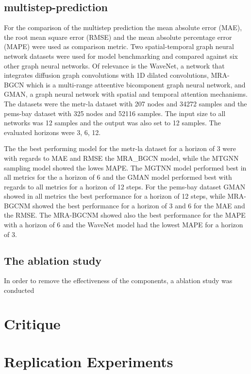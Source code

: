 \documentclass[letterpaper,twocolumn,11pt]{article}
\begin{document}
    \subsection{multistep-prediction}
    For the comparison of the multistep prediction the mean absolute error (MAE), the root mean square error (RMSE) and the mean absolute percentage error (MAPE) were used as comparison metric.
    Two spatial-temporal graph neural network datasets were used for model benchmarking and compared against six other graph neural networks.
    Of relevance is the WaveNet, a network that integrates diffusion graph convolutions with 1D dilated convolutions,
    MRA-BGCN which is a multi-range atteentive bicomponent graph neural network, and
    GMAN, a graph neural network with spatial and temporal attention mechanisms.
    The datasets were the metr-la dataset with 207 nodes and 34272 samples and the pems-bay dataset with 325 nodes and 52116 samples.
    The input size to all networks was 12 samples and the output was also set to 12 samples.
    The evaluated horizons were 3, 6, 12.

    The the best performing model for the metr-la dataset for a horizon of 3 were with regards to MAE and RMSE the MRA\_BGCN model, while the MTGNN sampling model showed the lowes MAPE.
    The MGTNN model performed best in all metrics for the a horizon of 6 and the GMAN model performed best with regards to all metrics for a horizon of 12 steps.
    For the pems-bay dataset GMAN showed in all metrics the best performance for a horizon of 12 steps, while MRA-BGCNM showed the best performance for a horizon of 3 and 6 for the MAE and the RMSE.
    The MRA-BGCNM showed also the best performance for the MAPE with a horizon of 6 and the WaveNet model had the lowest MAPE for a horizon of 3.

    \subsection{The ablation study}
    In order to remove the effectiveness of the components, a ablation study was conducted


    \section{Critique}



    \section{Replication Experiments}
\end{document}
